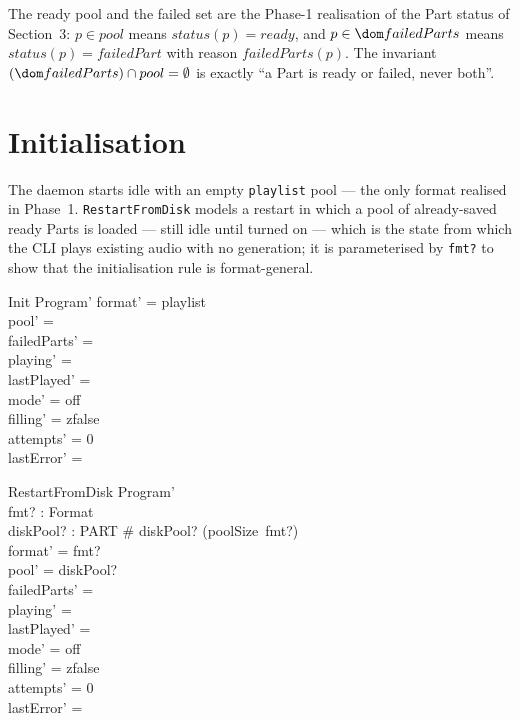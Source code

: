 \documentclass[a4paper,10pt,fleqn]{article}
\begin{document}
The ready pool and the failed set are the Phase-1 realisation of the Part
status of Section~3: $p \in pool$ means $status(p) = ready$, and
$p \in \dom failedParts$ means $status(p) = failedPart$ with reason
$failedParts(p)$. The invariant $(\dom failedParts) \cap pool = \emptyset$ is
exactly ``a Part is ready or failed, never both''.

\section{Initialisation}

The daemon starts idle with an empty \texttt{playlist} pool --- the only format
realised in Phase~1. \texttt{RestartFromDisk} models a restart in which a pool
of already-saved ready Parts is loaded --- still idle until turned on --- which
is the state from which the CLI plays existing audio with no generation; it is
parameterised by \texttt{fmt?} to show that the initialisation rule is
format-general.

\begin{schema}{Init}
  Program'
  \where
  format' = playlist \\
  pool' = \emptyset \\
  failedParts' = \emptyset \\
  playing' = \emptyset \\
  lastPlayed' = \emptyset \\
  mode' = off \\
  filling' = zfalse \\
  attempts' = 0 \\
  lastError' = \emptyset
\end{schema}

\begin{schema}{RestartFromDisk}
  Program' \\
  fmt? : Format \\
  diskPool? : \power PART
  \where
  \# diskPool? \leq (poolSize~fmt?) \\
  format' = fmt? \\
  pool' = diskPool? \\
  failedParts' = \emptyset \\
  playing' = \emptyset \\
  lastPlayed' = \emptyset \\
  mode' = off \\
  filling' = zfalse \\
  attempts' = 0 \\
  lastError' = \emptyset
\end{schema}
\end{document}
